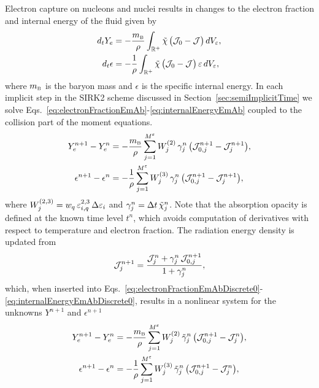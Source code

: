 \documentclass[10pt,preprint]{aastex}
\begin{document}
Electron capture on nucleons and nuclei results in changes to the electron fraction and internal energy of the fluid given by
\begin{align}
  d_{t}Y_{e}
  &=-\frac{m_{\mbox{\tiny B}}}{\rho}\int_{\mathbb{R}^{+}}\tilde{\chi}\,\big(\mathcal{J}_{0}-\mathcal{J}\big)\,dV_{\varepsilon}, \label{eq:electronFractionEmAb} \\
  d_{t}\epsilon
  &=-\frac{1}{\rho}\int_{\mathbb{R}^{+}}\tilde{\chi}\,\big(\mathcal{J}_{0}-\mathcal{J}\big)\,\varepsilon\,dV_{\varepsilon}, \label{eq:internalEnergyEmAb}
\end{align}
where $m_{\mbox{\tiny B}}$ is the baryon mass and $\epsilon$ is the specific internal energy.  
In each implicit step in the SIRK2 scheme discussed in Section~\ref{sec:semiImplicitTime} we solve Eqs.~\eqref{eq:electronFractionEmAb}-\eqref{eq:internalEnergyEmAb} coupled to the collision part of the moment equations.  
\begin{align}
  Y_{e}^{n+1}-Y_{e}^{n}
  &=-\frac{m_{\mbox{\tiny B}}}{\rho}\sum_{j=1}^{M^{\varepsilon}}W_{j}^{(2)}\,\gamma_{j}^{n}\,\big(\mathcal{J}_{0,j}^{n+1}-\mathcal{J}_{j}^{n+1}\big), \label{eq:electronFractionEmAbDiscrete0} \\
  \epsilon^{n+1}-\epsilon^{n}
  &=-\frac{1}{\rho}\sum_{j=1}^{M^{\varepsilon}}W_{j}^{(3)}\,\gamma_{j}^{n}\,\big(\mathcal{J}_{0,j}^{n+1}-\mathcal{J}_{j}^{n+1}\big), \label{eq:internalEnergyEmAbDiscrete0}
\end{align}
where $W_{j}^{(2,3)}=w_{q}\,\varepsilon_{i,q}^{2,3}\,\Delta\varepsilon_{i}$ and $\gamma_{j}^{n}=\Delta t\,\tilde{\chi}_{j}^{n}$.  
Note that the absorption opacity is defined at the known time level $t^{n}$, which avoids computation of derivatives with respect to temperature and electron fraction.  
The radiation energy density is updated from
\begin{equation}
  \mathcal{J}_{j}^{n+1}=\frac{\mathcal{J}_{j}^{n}+\gamma_{j}^{n}\,\mathcal{J}_{0,j}^{n+1}}{1+\gamma_{j}^{n}}, 
  \label{eq:momentEquationEnergyEmAbDiscrete}
\end{equation}
which, when inserted into Eqs.~\eqref{eq:electronFractionEmAbDiscrete0}-\eqref{eq:internalEnergyEmAbDiscrete0}, results in a nonlinear system for the unknowns $Y^{n+1}$ and $\epsilon^{n+1}$
\begin{align}
  Y_{e}^{n+1}-Y_{e}^{n}
  &=-\frac{m_{\mbox{\tiny B}}}{\rho}\sum_{j=1}^{M^{\varepsilon}}W_{j}^{(2)}\,\tilde{\gamma}_{j}^{n}\,\big(\mathcal{J}_{0,j}^{n+1}-\mathcal{J}_{j}^{n}\big), \label{eq:electronFractionEmAbDiscrete} \\
  \epsilon^{n+1}-\epsilon^{n}
  &=-\frac{1}{\rho}\sum_{j=1}^{M^{\varepsilon}}W_{j}^{(3)}\,\tilde{\gamma}_{j}^{n}\,\big(\mathcal{J}_{0,j}^{n+1}-\mathcal{J}_{j}^{n}\big), \label{eq:internalEnergyEmAbDiscrete}
\end{align}
\end{document}
